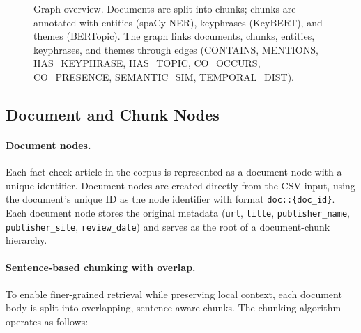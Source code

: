 \documentclass[10pt]{article}
\begin{document}
\begin{figure}[H]
    \caption{Graph overview. Documents are split into chunks; chunks are annotated with entities (spaCy NER), keyphrases (KeyBERT), and themes (BERTopic). The graph links documents, chunks, entities, keyphrases, and themes through edges (CONTAINS, MENTIONS, HAS\_KEYPHRASE, HAS\_TOPIC, CO\_OCCURS, CO\_PRESENCE, SEMANTIC\_SIM, TEMPORAL\_DIST).}
    \label{fig:graph_overview}
\end{figure}

\subsection{Document and Chunk Nodes}

\paragraph{Document nodes.} Each fact-check article in the corpus is represented as a document node with a unique identifier. Document nodes are created directly from the CSV input, using the document's unique ID as the node identifier with format \texttt{doc::\{doc\_id\}}. Each document node stores the original metadata (\texttt{url}, \texttt{title}, \texttt{publisher\_name}, \texttt{publisher\_site}, \texttt{review\_date}) and serves as the root of a document-chunk hierarchy.

\paragraph{Sentence-based chunking with overlap.} To enable finer-grained retrieval while preserving local context, each document body is split into overlapping, sentence-aware chunks. The chunking algorithm operates as follows:
\end{document}
